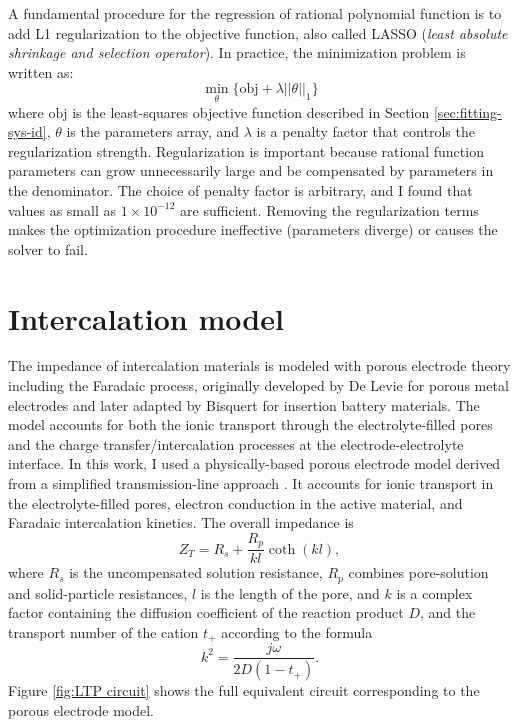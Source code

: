 A fundamental procedure for the regression of rational polynomial function is to add L1 regularization to the objective function, also called LASSO (\emph{least absolute shrinkage and selection operator}).
In practice, the minimization problem is written as:
\begin{equation}
  \min_{\theta}\{ \text{obj} + \lambda ||\theta||_1  \}
\end{equation}
where $\text{obj}$ is the least-squares objective function described in Section \ref{sec:fitting-sys-id}, $\theta$ is the parameters array, and $\lambda$ is a penalty factor that controls the regularization strength.
Regularization is important because rational function parameters can grow unnecessarily large and be compensated by parameters in the denominator.
The choice of penalty factor is arbitrary, and I found that values as small as $1 \times 10^{-12}$ are sufficient.
Removing the regularization terms makes the optimization procedure ineffective (parameters diverge) or causes the solver to fail.

\section{Intercalation model}

The impedance of intercalation materials is modeled with porous electrode theory including the Faradaic process, originally developed by De Levie \cite{deleviePorousElectrodesElectrolyte1963} for porous metal electrodes and later adapted by Bisquert \cite{bisquertInfluenceBoundaries2000} for insertion battery materials. The model accounts for both the ionic transport through the electrolyte-filled pores and the charge transfer/intercalation processes at the electrode-electrolyte interface.
In this work, I used a physically-based porous electrode model derived from a simplified transmission-line approach \cite{lamantiaImpedancePorous2008,erinmwingbovoDynamicImpedanceSpectroscopy2019a}. 
It accounts for ionic transport in the electrolyte-filled pores, electron conduction in the active material, and Faradaic intercalation kinetics. The overall impedance is 
\begin{equation}
Z_T = R_s + \frac{R_p}{k l} \coth(k l),
\end{equation}
where $R_s$ is the uncompensated solution resistance, $R_p$ combines pore-solution and solid-particle resistances, $l$ is the length of the pore, and $k$ is a complex factor containing the diffusion coefficient of the reaction product $D$, and the transport number of the cation $t_+$ according to the formula
\begin{equation}
    k^2=\frac{j\omega}{2D(1-t_+)}.
\end{equation}
Figure \ref{fig:LTP circuit} shows the full equivalent circuit corresponding to the porous electrode model.

